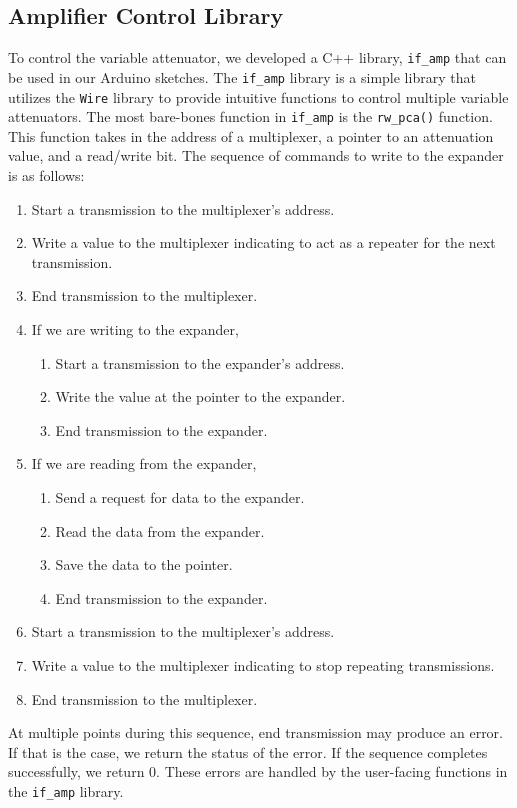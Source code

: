\subsection{Amplifier Control Library}
To control the variable attenuator, we developed a C++ library, \texttt{if\_amp} that can be used in our Arduino sketches.
The \texttt{if\_amp} library is a simple library that utilizes the \texttt{Wire} library to provide intuitive functions to control multiple variable attenuators.
The most bare-bones function in \texttt{if\_amp} is the \texttt{rw\_pca()} function.
This function takes in the address of a multiplexer, a pointer to an attenuation value, and a read/write bit.
The sequence of commands to write to the expander is as follows:
\begin{enumerate}
    \item Start a transmission to the multiplexer's address.
    \item Write a value to the multiplexer indicating to act as a repeater for the next transmission.
    \item End transmission to the multiplexer.
    \item If we are writing to the expander,
    \begin{enumerate}
        \item Start a transmission to the expander's address.
        \item Write the value at the pointer to the expander.
        \item End transmission to the expander.
    \end{enumerate}
    \item If we are reading from the expander,
    \begin{enumerate}
        \item Send a request for data to the expander.
        \item Read the data from the expander.
        \item Save the data to the pointer.
        \item End transmission to the expander.
    \end{enumerate}
    \item Start a transmission to the multiplexer's address.
    \item Write a value to the multiplexer indicating to stop repeating transmissions.
    \item End transmission to the multiplexer.
\end{enumerate}
At multiple points during this sequence, end transmission may produce an error. 
If that is the case, we return the status of the error.
If the sequence completes successfully, we return 0.
These errors are handled by the user-facing functions in the \texttt{if\_amp} library.

